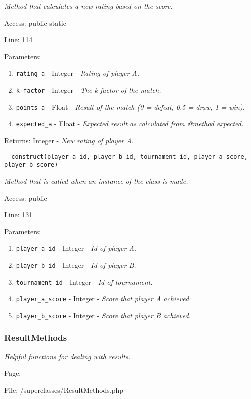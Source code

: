 {\scriptsize
\textit{Method that calculates a new rating based on the score.}

Access: public static

Line: 114

Parameters:

\begin{enumerate}
\item \texttt{rating\_a} - Integer - \textit{Rating of player A.}
\item \texttt{k\_factor} - Integer - \textit{The k factor of the match.}
\item \texttt{points\_a} - Float - \textit{Result of the match (0 = defeat, 0.5 = draw, 1 = win).}
\item \texttt{expected\_a} - Float - \textit{Expected result as calculated from @method expected.}
\end{enumerate}
Returns: Integer - \textit{New rating of player A.}

}

\texttt{\_\_construct(player\_a\_id, player\_b\_id, tournament\_id, player\_a\_score, player\_b\_score)}

{\scriptsize
\textit{Method that is called when an instance of the class is made.}

Access: public

Line: 131

Parameters:

\begin{enumerate}
\item \texttt{player\_a\_id} - Integer - \textit{Id of player A.}
\item \texttt{player\_b\_id} - Integer - \textit{Id of player B.}
\item \texttt{tournament\_id} - Integer - \textit{Id of tournament.}
\item \texttt{player\_a\_score} - Integer - \textit{Score that player A achieved.}
\item \texttt{player\_b\_score} - Integer - \textit{Score that player B achieved.}
\end{enumerate}
}

\subsubsection{ResultMethods}\label{ResultMethods.php.doc}
\textit{Helpful functions for dealing with results.}

Page: \pageref{ResultMethods.php}

File: /superclasses/ResultMethods.php

